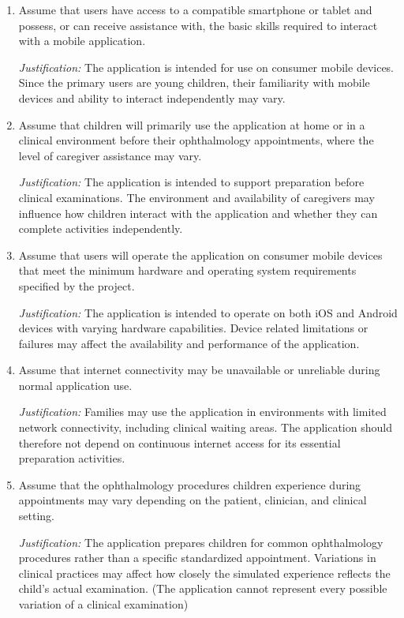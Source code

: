 \documentclass{article}
\begin{document}
\begin{enumerate}

    \item Assume that users have access to a compatible smartphone
    or tablet and possess, or can receive assistance with, the
    basic skills required to interact with a mobile application.

    \textit{Justification:}
    The application is intended for use on consumer mobile devices.
    Since the primary users are young children, their familiarity
    with mobile devices and ability to interact independently may
    vary.

    \item Assume that children will primarily use the application
    at home or in a clinical environment before their ophthalmology
    appointments, where the level of caregiver assistance may vary.

    \textit{Justification:}
    The application is intended to support preparation before
    clinical examinations. The environment and availability of
    caregivers may influence how children interact with the
    application and whether they can complete activities
    independently.

    \item Assume that users will operate the application on 
    consumer mobile devices that meet the minimum hardware 
    and operating system requirements specified by the project.

    \textit{Justification:}
    The application is intended to operate on both iOS and Android
    devices with varying hardware capabilities. Device related
    limitations or failures may affect the availability and
    performance of the application.

    \item Assume that internet connectivity may be unavailable
    or unreliable during normal application use.

    \textit{Justification:}
    Families may use the application in environments with
    limited network connectivity, including clinical waiting
    areas. The application should therefore not depend on
    continuous internet access for its essential preparation
    activities.

    \item Assume that the ophthalmology procedures children 
    experience during appointments may vary depending on the 
    patient, clinician, and clinical setting.

    \textit{Justification:}
    The application prepares children for common ophthalmology
    procedures rather than a specific standardized appointment.
    Variations in clinical practices may affect how closely
    the simulated experience reflects the child's actual
    examination. (The application cannot represent every
    possible variation of a clinical examination)


\end{enumerate}
\end{document}
